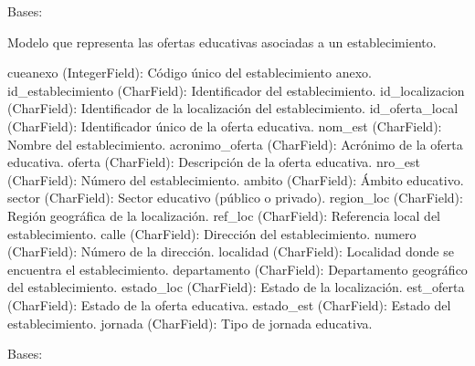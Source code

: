 \documentclass[letterpaper,10pt,spanish]{sphinxmanual}
\begin{document}
\begin{fulllineitems}

\pysigstartsignatures
{}
\pysigstopsignatures
\sphinxAtStartPar
Bases: 

\sphinxAtStartPar
Modelo que representa las ofertas educativas asociadas a un establecimiento.
\begin{description}
\sphinxAtStartPar
cueanexo (IntegerField): Código único del establecimiento anexo.
id\_establecimiento (CharField): Identificador del establecimiento.
id\_localizacion (CharField): Identificador de la localización del establecimiento.
id\_oferta\_local (CharField): Identificador único de la oferta educativa.
nom\_est (CharField): Nombre del establecimiento.
acronimo\_oferta (CharField): Acrónimo de la oferta educativa.
oferta (CharField): Descripción de la oferta educativa.
nro\_est (CharField): Número del establecimiento.
ambito (CharField): Ámbito educativo.
sector (CharField): Sector educativo (público o privado).
region\_loc (CharField): Región geográfica de la localización.
ref\_loc (CharField): Referencia local del establecimiento.
calle (CharField): Dirección del establecimiento.
numero (CharField): Número de la dirección.
localidad (CharField): Localidad donde se encuentra el establecimiento.
departamento (CharField): Departamento geográfico del establecimiento.
estado\_loc (CharField): Estado de la localización.
est\_oferta (CharField): Estado de la oferta educativa.
estado\_est (CharField): Estado del establecimiento.
jornada (CharField): Tipo de jornada educativa.

\end{description}


\begin{fulllineitems}

\pysigstartsignatures
{}
\pysigstopsignatures
\sphinxAtStartPar
Bases: 

\end{fulllineitems}



\begin{fulllineitems}


\end{fulllineitems}
\end{fulllineitems}
\end{document}
